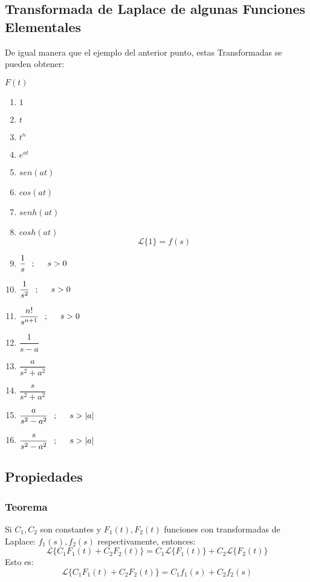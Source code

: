 \subsection*{Transformada de Laplace de algunas Funciones Elementales}
De igual manera que el ejemplo del anterior punto, estas Transformadas se pueden obtener:
\begin{multicols}{2}
\begin{center}
$F(t)$
\end{center}
\begin{enumerate}[1)]
\item $1$
\item $t$ 
\item $t^n$
\item $e^{at}$
\item $sen(at)$
\item $cos(at)$
\item $senh(at)$
\item $cosh(at)$
\columnbreak
$$\mathscr{L} \lbrace 1\rbrace=f(s)$$
\item[] $\dfrac{1}{s} \hspace{0.25cm};\hspace{0.5cm}s>0$
\item[] $\dfrac{1}{s^2} \hspace{0.25cm};\hspace{0.5cm}s>0$
\item[] $\dfrac{n!}{s^{n+1}} \hspace{0.25cm};\hspace{0.5cm}s>0$
\item[] $\dfrac{1}{s-a}$
\item[] $\dfrac{a}{s^2+a^2}$
\item[] $\dfrac{s}{s^2+a^2}$
\item[] $\dfrac{a}{s^2-a^2} \hspace{0.25cm};\hspace{0.5cm}s>|a|$
\item[] $\dfrac{s}{s^2-a^2} \hspace{0.25cm};\hspace{0.5cm}s>|a|$
\end{enumerate}
\end{multicols}
\subsection*{Propiedades}
\subsubsection*{Teorema}
Si $C_1,C_2$ son constantes y $F_1(t),F_2(t)$ funciones con transformadas de Laplace: $f_1(s),f_2(s)$ respectivamente, entonces:
$$\mathscr{L} \lbrace C_1 F_1(t)+C_2 F_2(t) \rbrace = C_1\mathscr{L}\lbrace F_1(t)\rbrace + C_2\mathscr{L}\lbrace F_2(t)\rbrace$$
Esto es:
$$\mathscr{L} \lbrace C_1 F_1(t)+C_2 F_2(t) \rbrace = C_1 f_1(s) +  C_2 f_2(s)$$
